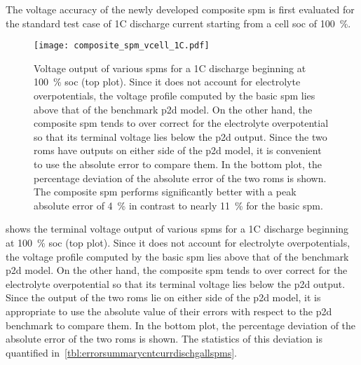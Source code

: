 The  voltage  accuracy of  the  newly  developed  composite \gls{spm}  is  first
evaluated for  the standard test  case of 1C  discharge current starting  from a
cell \gls{soc} of \SI{100}{\percent}.

\begin{figure}[!htbp]
    \centering
    \texttt{[image: composite\_spm\_vcell\_1C.pdf]}
    \caption[%
    Comparison  of  terminal  voltages  of  composite  ,  basic
     and the  model for a 1C discharge
    ]%
    {%
        Voltage output  of various \glspl{spm}  for a 1C discharge  beginning at
        \SI{100}{\percent} \gls{soc} (top  plot). Since it does  not account for
        electrolyte overpotentials,  the voltage  profile computed by  the basic
        \gls{spm} lies above that of the benchmark \gls{p2d} model. On the other
        hand, the composite \gls{spm} tends  to over correct for the electrolyte
        overpotential  so that  its terminal  voltage lies  below the  \gls{p2d}
        output. Since  the two \glspl{rom}  have outputs  on either side  of the
        \gls{p2d}  model,  it  is  convenient  to  use  the  absolute  error  to
        compare  them. In  the  bottom  plot, the  percentage  deviation of  the
        absolute error of the two  \glspl{rom} is shown. The composite \gls{spm}
        performs  significantly better  with a  peak absolute  error of  \approx
        \SI{4}{\percent} in  contrast to nearly \SI{11}{\percent}  for the basic
        \gls{spm}.
    }%
    \label{fig:voltageoutputcompareallSPMs1C}
\end{figure}

  shows the  terminal voltage  output of
various \glspl{spm} for a 1C discharge beginning at \SI{100}{\percent} \gls{soc}
(top  plot). Since  it  does  not account  for  electrolyte overpotentials,  the
voltage profile computed by the basic \gls{spm} lies above that of the benchmark
\gls{p2d}  model. On  the  other hand,  the composite  \gls{spm}  tends to  over
correct  for the  electrolyte overpotential  so that  its terminal  voltage lies
below  the \gls{p2d}  output. Since  the output  of the  two \glspl{rom}  lie on
either side of the \gls{p2d} model, it  is appropriate to use the absolute value
of their errors with respect to the  \gls{p2d} benchmark to compare them. In the
bottom  plot,  the  percentage  deviation  of the  absolute  error  of  the  two
\glspl{rom} is shown. The statistics of this deviation is quantified
in~\cref{tbl:errorsummarycntcurrdischgallspms}.

